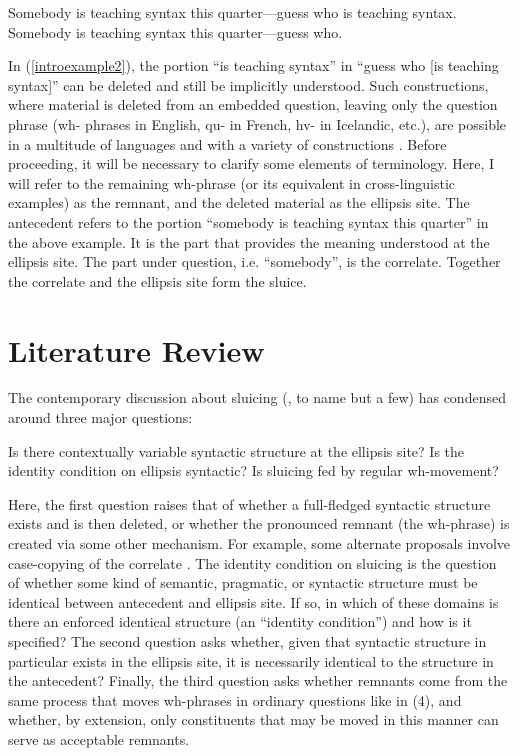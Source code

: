\documentclass{turabian-researchpaper}
\begin{document}
\begin{exe}
\ex\label{introexample1} Somebody is teaching syntax this quarter---guess who is teaching syntax. 
\ex\label{introexample2} Somebody is teaching syntax this quarter---guess who. 
\end{exe} 

In (\ref{introexample2}), the portion ``is teaching syntax'' in ``guess who [is teaching syntax]'' can be deleted and still be implicitly understood. Such constructions, where material is deleted from an embedded question, leaving only the question phrase (wh- phrases in English, qu- in French, hv- in Icelandic, etc.), are possible in a multitude of languages and with a variety of constructions \citep{merchant}.  Before proceeding, it will be necessary to clarify some elements of terminology. Here, I will refer to the remaining wh-phrase (or its equivalent in cross-linguistic examples) as the remnant, and the deleted material as the ellipsis site. The antecedent refers to the portion ``somebody is teaching syntax this quarter'' in the above example. It is the part that provides the meaning understood at the ellipsis site. The part under question, i.e. ``somebody'', is the correlate. Together the correlate and the ellipsis site form the sluice. 

\section{Literature Review}
The contemporary discussion about sluicing (\citealt{merchant, clm, barros14}, to name but a few) has condensed around three major questions: 
\begin{exe}
\ex\label{bigquestions} 
\begin{xlist}
\ex Is there contextually variable syntactic structure at the ellipsis site? 
\ex Is the identity condition on ellipsis syntactic? 
\ex Is sluicing fed by regular wh-movement? 
\end{xlist}
\end{exe}

\noindent Here, the first question raises that of whether a full-fledged syntactic structure exists and is then deleted, or whether the pronounced remnant (the wh-phrase) is created via some other mechanism. For example, some alternate proposals involve case-copying of the correlate \citep{manetta2013, chomsky1995principles}.  
The identity condition on sluicing is the question of whether some kind of semantic, pragmatic, or syntactic structure must be identical between antecedent and ellipsis site. If so, in which of these domains is there an enforced identical structure (an ``identity condition'') and how is it specified?  The second question asks whether, given that syntactic structure in particular exists in the ellipsis site, it is necessarily identical to the structure in the antecedent? Finally, the third question asks whether remnants come from the same process that moves wh-phrases in ordinary questions like in (4), and whether, by extension, only constituents that may be moved in this manner can serve as acceptable remnants.  
\end{document}
